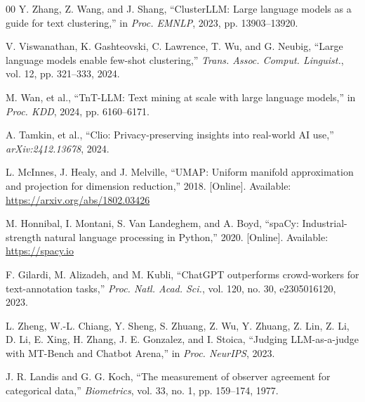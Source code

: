 \documentclass[conference]{IEEEtran}
\begin{document}
\begin{thebibliography}{00}
Y. Zhang, Z. Wang, and J. Shang, ``ClusterLLM: Large language models as a guide for text clustering,'' in \textit{Proc. EMNLP}, 2023, pp. 13903--13920.

V. Viswanathan, K. Gashteovski, C. Lawrence, T. Wu, and G. Neubig, ``Large language models enable few-shot clustering,'' \textit{Trans. Assoc. Comput. Linguist.}, vol. 12, pp. 321--333, 2024.

M. Wan, et al., ``TnT-LLM: Text mining at scale with large language models,'' in \textit{Proc. KDD}, 2024, pp. 6160--6171.

A. Tamkin, et al., ``Clio: Privacy-preserving insights into real-world AI use,'' \textit{arXiv:2412.13678}, 2024.

L. McInnes, J. Healy, and J. Melville, ``UMAP: Uniform manifold approximation and projection for dimension reduction,'' 2018. [Online]. Available: \url{https://arxiv.org/abs/1802.03426}

M. Honnibal, I. Montani, S. Van Landeghem, and A. Boyd, ``spaCy: Industrial-strength natural language processing in Python,'' 2020. [Online]. Available: \url{https://spacy.io}

F. Gilardi, M. Alizadeh, and M. Kubli, ``ChatGPT outperforms crowd-workers for text-annotation tasks,'' \textit{Proc. Natl. Acad. Sci.}, vol. 120, no. 30, e2305016120, 2023.

L. Zheng, W.-L. Chiang, Y. Sheng, S. Zhuang, Z. Wu, Y. Zhuang, Z. Lin, Z. Li, D. Li, E. Xing, H. Zhang, J. E. Gonzalez, and I. Stoica, ``Judging LLM-as-a-judge with MT-Bench and Chatbot Arena,'' in \textit{Proc. NeurIPS}, 2023.

J. R. Landis and G. G. Koch, ``The measurement of observer agreement for categorical data,'' \textit{Biometrics}, vol. 33, no. 1, pp. 159--174, 1977.

\end{thebibliography}
\end{document}
